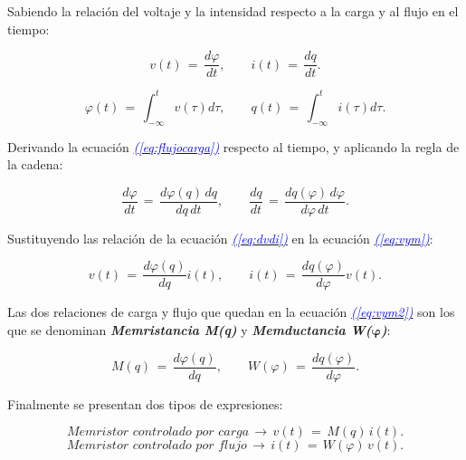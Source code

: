 \documentclass[12pt,a4paper]{report} %
\newcommand{\eref}[1]{\hyperref[#1]{\textcolor{blue}{\textit{(\ref*{#1})}}}}
\begin{document}
	Sabiendo la relación del voltaje y la intensidad respecto a la carga y al flujo en el tiempo:

	\begin{equation}
		v(t)\,=\,\frac{d\varphi}{dt}, \qquad i(t)\,=\,\frac{dq}{dt}.
		\label{eq:dvdi}
	\end{equation}
			
	\begin{equation}
		\varphi(t)\,=\,\int_{-\infty}^{t}v(\tau)d\tau, \qquad q(t)\,=\,\int_{-\infty}^{t}i(\tau)d\tau.
		\label{eq:flujocargaintegral}
	\end{equation}\smallskip
	
	Derivando la ecuación \eref{eq:flujocarga} respecto al tiempo, y aplicando la regla de la cadena:
	
	\begin{equation}
		\frac{d\varphi}{dt}\,=\,\frac{d\varphi(q)\,dq}{dq\,dt}, \qquad \frac{dq}{dt}\,=\,\frac{dq(\varphi)\,d\varphi}{d\varphi\,dt}.
		\label{eq:vym}
	\end{equation}\smallskip
	
	Sustituyendo las relación de la ecuación \eref{eq:dvdi} en la ecuación \eref{eq:vym}:
	
	\begin{equation}
		v(t)\,=\,\frac{d\varphi(q)}{dq}i(t), \qquad i(t)\,=\,\frac{dq(\varphi)}{d\varphi}v(t).
		\label{eq:vym2}
	\end{equation}\smallskip
	
	Las dos relaciones de carga y flujo que quedan en la ecuación \eref{eq:vym2} son los que se denominan \textbf{\textit{Memristancia M(q)}} y \textbf{\textit{Memductancia W($\bm{\varphi}$)}}: 
	
	\begin{equation}
		M(q)\,=\,\frac{d\varphi(q)}{dq}, \qquad W(\varphi)\,=\,\frac{dq(\varphi)}{d\varphi}.
		\label{eq:myw}
	\end{equation}\smallskip
	
	Finalmente se presentan dos tipos de expresiones:
	
	\begin{equation}
		\textit{Memristor controlado por carga} \, \rightarrow \, v(t)\,=\,M(q)\,i(t).
		\label{eq:cc}
	\end{equation}\smallskip
	\begin{equation}
		\textit{Memristor controlado por flujo} \, \rightarrow \, i(t)\,=\,W(\varphi)\,v(t).
		\label{eq:fc}
	\end{equation}\smallskip
\end{document}
